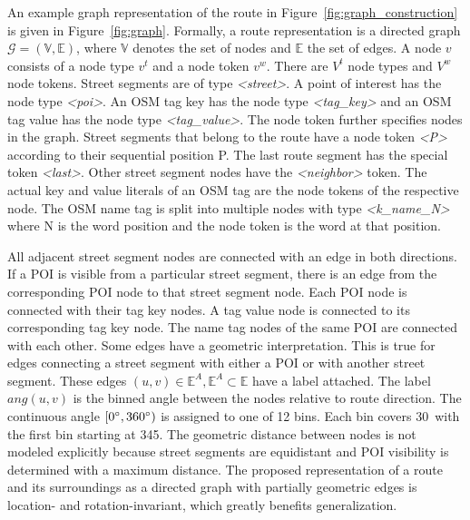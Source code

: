 \documentclass[11pt,a4paper]{article}
\def\gG{{\mathcal{G}}}
\def\sE{{\mathbb{E}}}
\def\sV{{\mathbb{V}}}
\begin{document}
An example graph representation of the route in Figure~\ref{fig:graph_construction} is given in Figure~\ref{fig:graph}. Formally, a route representation is a directed graph $\gG=(\sV, \sE)$, where $\sV$ denotes the set of nodes and $\sE$ the set of edges. A node $v$ consists of a node type $v^t$ and a node token $v^w$. There are $V^t$ node types and $V^w$ node tokens. Street segments are of type \textit{\textless street\textgreater}. A point of interest has the node type \textit{\textless poi\textgreater}. An OSM tag key has the node type \textit{\textless tag\_key\textgreater} and an OSM tag value has the node type \textit{\textless tag\_value\textgreater}. The node token further specifies nodes in the graph. Street segments that belong to the route have a node token \textit{\textless P\textgreater} according to their sequential position P. The last route segment has the special token \textit{\textless last\textgreater}. Other street segment nodes have the \textit{\textless neighbor\textgreater} token. The actual key and value literals of an OSM tag are the node tokens of the respective node. The OSM name tag is split into multiple nodes with type \textit{\textless k\_name\_N\textgreater} where N is the word position and the node token is the word at that position.

All adjacent street segment nodes are connected with an edge in both directions. If a POI is visible from a particular street segment, there is an edge from the corresponding POI node to that street segment node. Each POI node is connected with their tag key nodes. A tag value node is connected to its corresponding tag key node. The name tag nodes of the same POI are connected with each other. Some edges have a geometric interpretation. This is true for edges connecting a street segment with either a POI or with another street segment. These edges $(u,v) \in \sE^A, \sE^A \subset \sE$ have a label attached. The label $ang(u,v)$ is the binned angle between the nodes relative to route direction. The continuous angle $[0\degree, 360\degree)$ is assigned to one of 12 bins. Each bin covers 30\degree~with the first bin starting at 345\degree.
The geometric distance between nodes is not modeled explicitly because street segments are equidistant and POI visibility is determined with a maximum distance.
The proposed representation of a route and its surroundings as a directed graph with partially geometric edges is location- and rotation-invariant, which greatly benefits generalization. 
\end{document}

